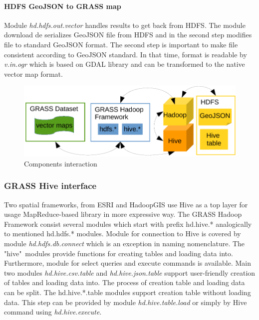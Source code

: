 \documentclass[a4paper,12pt,oneside]{report}
\begin{document}
	
	
    \paragraph{HDFS GeoJSON to GRASS map}
    Module \textit{hd.hdfs.out.vector} handles results to get back from HDFS.
    The module download de serializes GeoJSON file from HDFS and in the second step
    modifies file to standard GeoJSON format. The second step is important to make
    file consistent according to GeoJSON standard. In that time, format is readable
    by \textit{v.in.ogr} which is based on GDAL library and can be transformed
    to the native vector map format.
    \begin{figure}[!htbp]
    	\centering
    	\includegraphics[width=1\textwidth]{./img/ghf_overview.pdf}
    	\caption[Components interaction]{\centering Components interaction}
    \end{figure} 
    \subsubsection{GRASS Hive interface}\label{hive:tables}
    Two spatial frameworks, from ESRI and HadoopGIS use Hive as a top layer for
    usage MapReduce-based library in more expressive way. The GRASS Hadoop Framework
    consist several modules which start with prefix hd.hive.* analogically to mentioned
    hd.hdfs.* modules. Module for connection to Hive is covered by module
    \textit{hd.hdfs.db.connect} which is an exception in naming nomenclature. The
    "hive"~modules provide functions for creating tables and loading data into.
    Furthermore, module for select queries and execute commands is available. Main
    two modules \textit{hd.hive.csv.table} and \textit{hd.hive.json.table} support 
    user-friendly creation of tables and loading data into. The process of creation table
    and loading data can be split. The hd.hive.*.table modules support creation table
    without loading data. This step can be provided by module \textit{hd.hive.table.load} or
    simply by Hive command using \textit{hd.hive.execute}.
    
\end{document}
